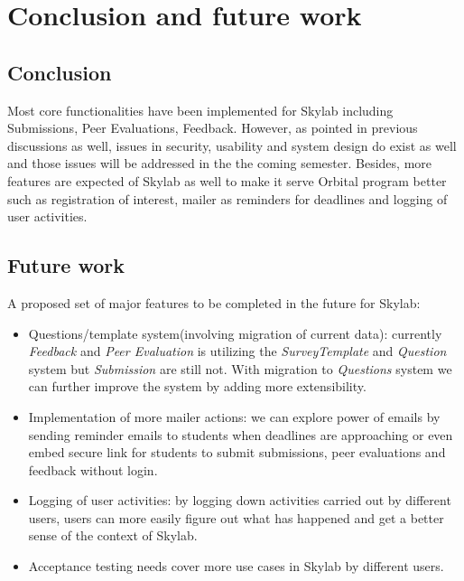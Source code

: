 \chapter{Conclusion and future work} \label{conclusionandfuturework}

\section{Conclusion}

Most core functionalities have been implemented for Skylab including Submissions, Peer Evaluations, Feedback. However, as pointed in previous discussions as well, issues in security, usability and system design do exist as well and those issues will be addressed in the the coming semester. Besides, more features are expected of Skylab as well to make it serve Orbital program better such as registration of interest, mailer as reminders for deadlines and logging of user activities.

\section{Future work}

A proposed set of major features to be completed in the future for Skylab:

\begin{itemize}
  \item Questions/template system(involving migration of current data): currently \textit{Feedback} and \textit{Peer Evaluation} is utilizing the \textit{SurveyTemplate} and \textit{Question} system but \textit{Submission} are still not. With migration to \textit{Questions} system we can further improve the system by adding more extensibility.
  \item Implementation of more mailer actions: we can explore power of emails by sending reminder emails to students when deadlines are approaching or even embed secure link for students to submit submissions, peer evaluations and feedback without login.
  \item Logging of user activities: by logging down activities carried out by different users, users can more easily figure out what has happened and get a better sense of the context of Skylab.
  \item Acceptance testing needs cover more use cases in Skylab by different users.
\end{itemize}

